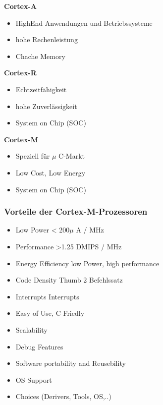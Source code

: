\begin{multicols}{3}
    \textbf{Cortex-A}
    \begin{itemize}
        \item HighEnd Anwendungen und Betriebssysteme
        \item hohe Rechenleistung
        \item Chache Memory
    \end{itemize}
    
    \textbf{Cortex-R}
    \begin{itemize}
        \item Echtzeitfähigkeit
        \item hohe Zuverlässigkeit
        \item System on Chip (SOC) 
    \end{itemize}  
    
    \textbf{Cortex-M}
    \begin{itemize}
        \item Speziell für $\mu$ C-Markt
        \item Low Cost, Low Energy
        \item System on Chip (SOC) 
    \end{itemize}             
\end{multicols}

\subsubsection{Vorteile der Cortex-M-Prozessoren}
\begin{multicols}{2}
    \begin{itemize}
        \item Low Power
        \subitem < 200$\mu$ A / MHz
        \item Performance
        \subitem >1.25 DMIPS / MHz
        \item Energy Efficiency
        \subitem low Power, high performance
        \item Code Density
        \subitem Thumb 2 Befehlssatz
        \item Interrupts
         Interrupts
        \item Easy of Use, C Friedly
        \item Scalability
        \item Debug Features
        \item Software portability and Reusebility
        \item OS Support
        \item Choices (Derivers, Tools, OS,..)    
    \end{itemize}
\end{multicols}
\clearpage 

